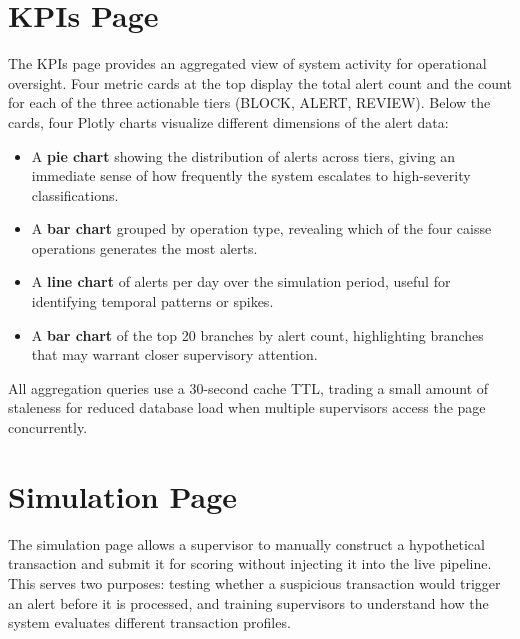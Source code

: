 \section{KPIs Page}
\label{sec:dashboard-kpis}

The KPIs page provides an aggregated view of system activity for
operational oversight. Four metric cards at the top display the total
alert count and the count for each of the three actionable tiers (BLOCK,
ALERT, REVIEW). Below the cards, four Plotly charts visualize different
dimensions of the alert data:

\begin{itemize}
    \item A \textbf{pie chart} showing the distribution of alerts across
          tiers, giving an immediate sense of how frequently the system
          escalates to high-severity classifications.
    \item A \textbf{bar chart} grouped by operation type, revealing which
          of the four caisse operations generates the most alerts.
    \item A \textbf{line chart} of alerts per day over the simulation
          period, useful for identifying temporal patterns or spikes.
    \item A \textbf{bar chart} of the top 20 branches by alert count,
          highlighting branches that may warrant closer supervisory
          attention.
\end{itemize}

All aggregation queries use a 30-second cache TTL, trading a small
amount of staleness for reduced database load when multiple supervisors
access the page concurrently.


\section{Simulation Page}
\label{sec:dashboard-simulation}

The simulation page allows a supervisor to manually construct a
hypothetical transaction and submit it for scoring without injecting it
into the live pipeline. This serves two purposes: testing whether a
suspicious transaction would trigger an alert before it is processed, and
training supervisors to understand how the system evaluates different
transaction profiles.


